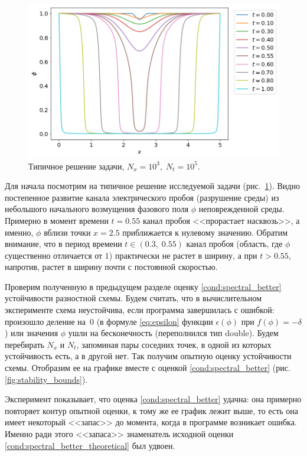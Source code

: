 \begin{figure}[!tp]
    \centering
    \includegraphics[width=\textwidth]{figures/typical_solution.png}
    \vspace{-0.8cm}
    \caption{Типичное решение задачи, $N_x = 10^3, \; N_t = 10^5$.}
    \label{fig:typical_solution}
\end{figure}

Для начала посмотрим на типичное решение исследуемой задачи (рис.~\ref{fig:typical_solution}). Видно постепенное развитие канала электрического пробоя (разрушение среды) из небольшого начального возмущения фазового поля $\phi$ неповрежденной среды. Примерно в момент времени $t = 0.55$ канал пробоя <<прорастает насквозь>>, а именно, $\phi$ вблизи точки $x = 2.5$ приближается к нулевому значению. Обратим внимание, что в период времени $t \in (0.3, \; 0.55)$ канал пробоя (область, где $\phi$ существенно отличается от $1$) практически не растет в ширину, а при $t > 0.55$, напротив, растет в ширину почти с постоянной скоростью.

Проверим полученную в предыдущем разделе оценку \eqref{cond:spectral_better} устойчивости разностной схемы. Будем считать, что в вычислительном эксперименте схема неустойчива, если программа завершилась с ошибкой: произошло деление на~$0$ (в формуле \eqref{eq:epsilon} функции $\epsilon(\phi)$ при $f(\phi) = -\delta$) или значения $\phi$ ушли на бесконечность (переполнился тип double). Будем перебирать $N_x$ и $N_t$, запоминая пары соседних точек, в одной из которых устойчивость есть, а в другой нет. Так получим опытную оценку устойчивости схемы. Отобразим ее на графике вместе с оценкой \eqref{cond:spectral_better} (рис. \ref{fig:stability_bounds}).

Эксперимент показывает, что оценка \eqref{cond:spectral_better} удачна: она примерно повторяет контур опытной оценки, к тому же ее график лежит выше, то есть она имеет некоторый <<запас>> до момента, когда в программе возникает ошибка. Именно ради этого <<запаса>> знаменатель исходной оценки  \eqref{cond:spectral_better_theoretical} был удвоен.

